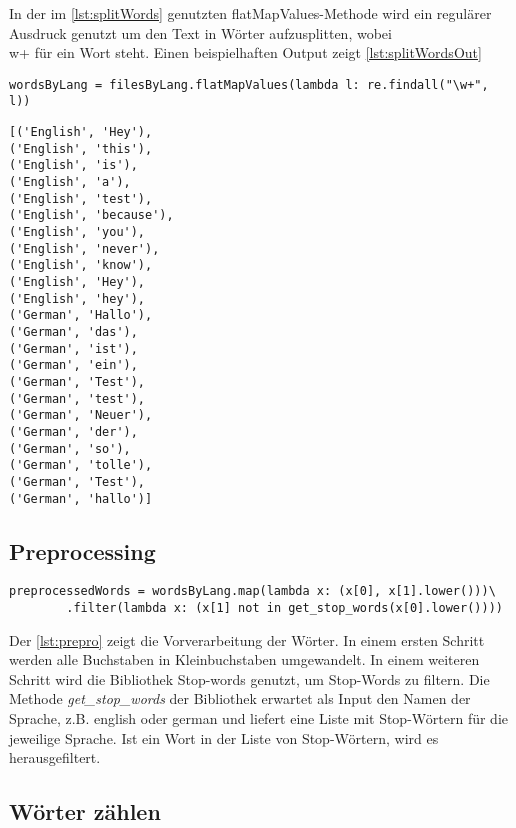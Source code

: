 \documentclass[chapterprefix=true, 12pt, a4paper, oneside, parskip=half, listof=totoc, bibliography=totoc, numbers=noendperiod]{scrbook}
\begin{document}
In der im \autoref{lst:splitWords} genutzten flatMapValues-Methode wird ein regulärer Ausdruck genutzt um den Text in Wörter aufzusplitten, wobei \\w+ für ein Wort steht. Einen beispielhaften Output zeigt \autoref{lst:splitWordsOut}


\begin{lstlisting}[caption={Wörter auftrennen}, captionpos=b, label={lst:splitWords}]
wordsByLang = filesByLang.flatMapValues(lambda l: re.findall("\w+", l))
\end{lstlisting}

\begin{lstlisting}[caption={Wörter auftrennen Output}, captionpos=b, label={lst:splitWordsOut}]
[('English', 'Hey'),
('English', 'this'),
('English', 'is'),
('English', 'a'),
('English', 'test'),
('English', 'because'),
('English', 'you'),
('English', 'never'),
('English', 'know'),
('English', 'Hey'),
('English', 'hey'),
('German', 'Hallo'),
('German', 'das'),
('German', 'ist'),
('German', 'ein'),
('German', 'Test'),
('German', 'test'),
('German', 'Neuer'),
('German', 'der'),
('German', 'so'),
('German', 'tolle'),
('German', 'Test'),
('German', 'hallo')]
\end{lstlisting}


 
 \subsection{Preprocessing}
 \begin{lstlisting}[caption={Vorbereitung}, captionpos=b, label={lst:prepro}]
 preprocessedWords = wordsByLang.map(lambda x: (x[0], x[1].lower()))\
        .filter(lambda x: (x[1] not in get_stop_words(x[0].lower())))
\end{lstlisting}

Der \autoref{lst:prepro} zeigt die Vorverarbeitung der Wörter. In einem ersten Schritt werden alle Buchstaben in Kleinbuchstaben umgewandelt. In einem weiteren Schritt wird die Bibliothek Stop-words genutzt, um Stop-Words zu filtern.\cite{STOPWORDS} Die Methode \textit{get\_stop\_words} der Bibliothek erwartet als Input den Namen der Sprache, z.B. english oder german und liefert eine Liste mit Stop-Wörtern für die jeweilige Sprache. Ist ein Wort in der Liste von Stop-Wörtern, wird es herausgefiltert.


\subsection{Wörter zählen}
\end{document}
